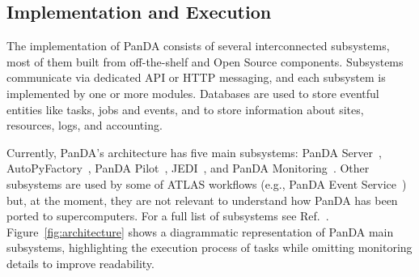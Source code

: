 

\subsection{Implementation and Execution}
\label{ssec:panda_arch}

The implementation of PanDA consists of several interconnected subsystems, most
of them built from off-the-shelf and Open Source components. Subsystems
communicate via dedicated API or HTTP messaging, and each subsystem is
implemented by one or more modules. Databases are used to store eventful
entities like tasks, jobs and events, and to store information about sites,
resources, logs, and accounting.

Currently, PanDA's architecture has five main subsystems: PanDA
Server~\cite{maeno2011overview},
AutoPyFactory~\cite{caballero2012autopyfactory}, PanDA
Pilot~\cite{nilsson2011atlas}, JEDI~\cite{borodin2015scaling}, and PanDA
Monitoring~\cite{klimentov2011atlas}. Other subsystems are used by some of ATLAS
workflows (e.g., PanDA Event Service~\cite{calafiura2015atlas}) but, at the
moment, they are not relevant to understand how PanDA has been ported to
supercomputers. For a full list of subsystems see Ref.~\cite{panda-wiki_url}.
Figure~\ref{fig:architecture} shows a diagrammatic representation of PanDA main
subsystems, highlighting the execution process of tasks while omitting
monitoring details to improve readability.


